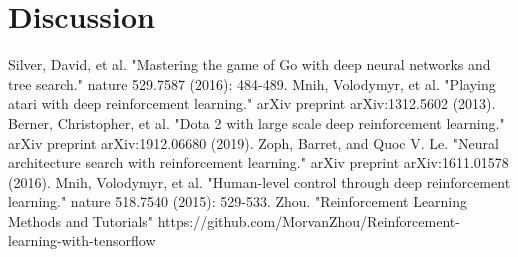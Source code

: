 \documentclass[12pt]{article}
\begin{document}

\section{Discussion}




\begin{thebibliography}{99}
	Silver, David, et al. "Mastering the game of Go with deep neural networks and tree search." nature 529.7587 (2016): 484-489.
	Mnih, Volodymyr, et al. "Playing atari with deep reinforcement learning." arXiv preprint arXiv:1312.5602 (2013).
	Berner, Christopher, et al. "Dota 2 with large scale deep reinforcement learning." arXiv preprint arXiv:1912.06680 (2019).
    Zoph, Barret, and Quoc V. Le. "Neural architecture search with reinforcement learning." arXiv preprint arXiv:1611.01578 (2016).
    Mnih, Volodymyr, et al. "Human-level control through deep reinforcement learning." nature 518.7540 (2015): 529-533.
    Zhou. "Reinforcement Learning Methods and Tutorials" https://github.com/MorvanZhou/Reinforcement-learning-with-tensorflow
\end{thebibliography}
\end{document}
